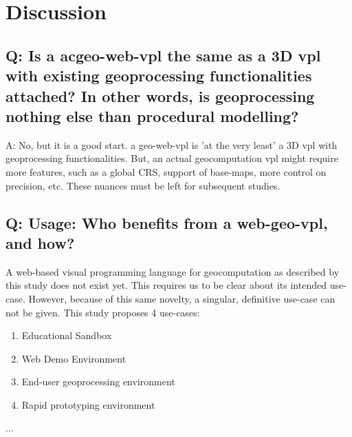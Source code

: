 
\section{Discussion}
\label{sec:discussion}


\subsection{Q: Is a ac{geo-web-vpl} the same as a 3D vpl with existing geoprocessing functionalities attached? In other words, is geoprocessing nothing else than procedural modelling?}

A: No, but it is a good start. a geo-web-vpl is 'at the very least' a 3D vpl with geoprocessing functionalities. 
But, an actual geocomputation vpl might require more features, such as a global CRS, support of base-maps, more control on precision, etc. 
These nuances must be left for subsequent studies. 

\subsection{Q: Usage: Who benefits from a web-geo-vpl, and how? }
A web-based visual programming language for geocomputation as described by this study does not exist yet. 
This requires us to be clear about its intended use-case. 
However, because of this same novelty, a singular, definitive use-case can not be given.
This study proposes 4 use-cases:
\begin{enumerate}[-]
  \item Educational Sandbox
  \item Web Demo Environment
  \item End-user geoprocessing environment 
  \item Rapid prototyping environment
\end{enumerate}

...




